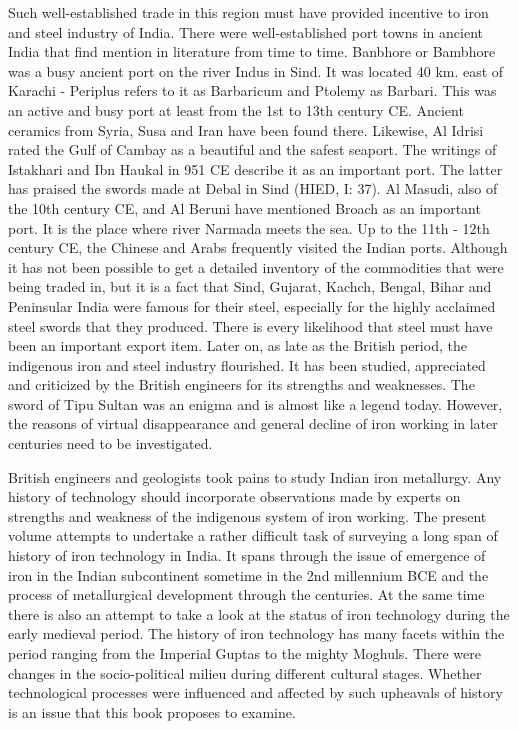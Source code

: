 Such well-established trade in this region must have provided incentive to iron and steel industry of India. There were well-established port towns in ancient India that find mention in literature from time to time. Banbhore or Bambhore was a busy ancient port on the river Indus in Sind. It was located 40 km. east of Karachi - Periplus refers to it as Barbaricum and Ptolemy as Barbari. This was an active and busy port at least from the 1st to 13th century CE. Ancient ceramics from Syria, Susa and Iran have been found there. Likewise, Al Idrisi rated the Gulf of Cambay as a beautiful and the safest seaport. The writings of Istakhari and Ibn Haukal in 951 CE describe it as an important port. The latter has praised the swords made at Debal in Sind (HIED, I: 37). Al Masudi, also of the 10th century CE, and Al Beruni have mentioned Broach as an important port. It is the place where river Narmada meets the sea. Up to the 11th - 12th century CE, the Chinese and Arabs frequently visited the Indian ports. Although it has not been possible to get a detailed inventory of the commodities that were being traded in, but it is a fact that Sind, Gujarat, Kachch, Bengal, Bihar and Peninsular India were famous for their steel, especially for the highly acclaimed steel swords that they produced. There is every likelihood that steel must have been an important export item. Later on, as late as the British period, the indigenous iron and steel industry flourished. It has been studied, appreciated and criticized by the British engineers for its strengths and weaknesses. The sword of Tipu Sultan was an enigma and is almost like a legend today. However, the reasons of virtual disappearance and general decline of iron working in later centuries need to be investigated.

British engineers and geologists took pains to study Indian iron metallurgy. Any history of technology should incorporate observations made by experts on strengths and weakness of the indigenous system of iron working. The present volume attempts to undertake a rather difficult task of surveying a long span of history of iron technology in India. It spans through the issue of emergence of iron in the Indian subcontinent sometime in the 2nd millennium BCE and the process of metallurgical development through the centuries. At the same time there is also an attempt to take a look at the status of iron technology during the early medieval period. The history of iron technology has many facets within the period ranging from the Imperial Guptas to the mighty Moghuls. There were changes in the socio-political milieu during different cultural stages. Whether technological processes were influenced and affected by such upheavals of history is an issue that this book proposes to examine.

